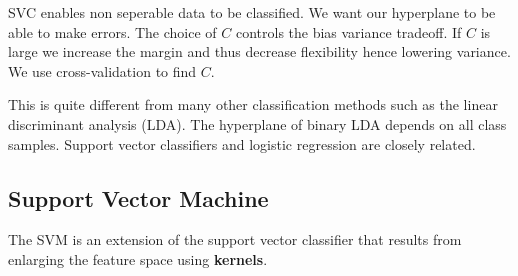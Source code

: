 \documentclass[../Main.tex]{subfiles}
\begin{document}
SVC enables non seperable data to be classified.
We want our hyperplane to be able to make errors.
The choice of \(C\) controls the bias variance tradeoff.
If \(C\) is large we increase the margin and thus decrease flexibility
hence lowering variance. We use cross-validation to find \(C\).

This is quite different from many 
other classification methods such as 
the linear discriminant analysis (LDA).
The hyperplane of binary LDA depends on 
all class samples.
Support vector classifiers and logistic 
regression are closely related.

\subsection{Support Vector Machine}
The SVM is an extension of the 
support vector classifier that results 
from enlarging the feature space 
using \textbf{kernels}.
\end{document}

